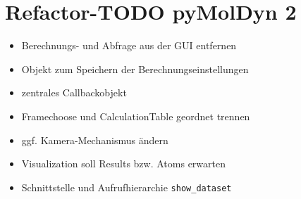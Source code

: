 \thispagestyle{empty}
\section*{Refactor-TODO pyMolDyn 2}
\begin{itemize}
	\item Berechnungs- und Abfrage aus der GUI entfernen
	\item Objekt zum Speichern der Berechnungseinstellungen
	\item zentrales Callbackobjekt
	\item Framechoose und CalculationTable geordnet trennen
	\item ggf. Kamera-Mechanismus ändern
    \item Visualization soll Results bzw. Atoms erwarten
    \item Schnittstelle und Aufrufhierarchie \texttt{show\_dataset}
\end{itemize}

